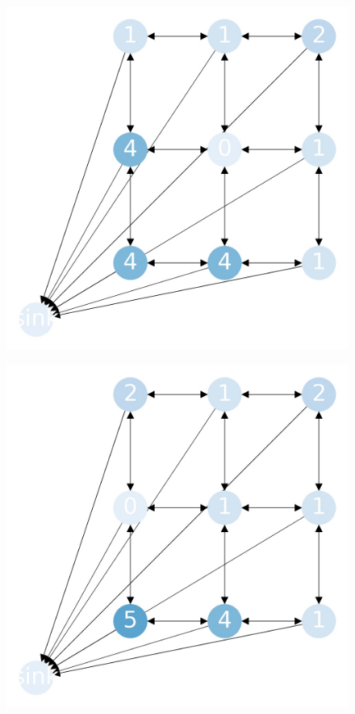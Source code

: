 \documentclass{beamer}
\begin{document}
    \begin{frame}
      \begin{figure}[h!]
        \centering
          \includegraphics[scale=0.25]{sandpile_-30}
      \end{figure}
    \end{frame}
    

    \begin{frame}
      \begin{figure}[h!]
        \centering
          \includegraphics[scale=0.25]{sandpile_-31}
      \end{figure}
    \end{frame}
    
\end{document}
